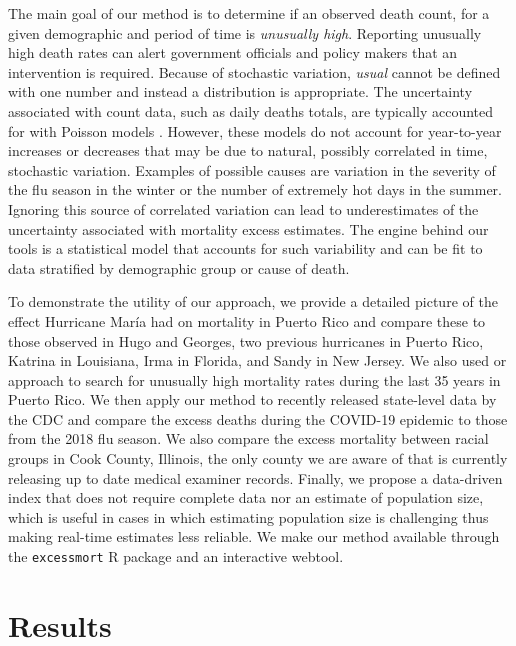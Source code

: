 \documentclass[11pt]{article}
\begin{document}
The main goal of our method is to determine if an observed death count, for a given demographic and period of time is \textit{unusually high}. Reporting unusually high death rates can alert government officials and policy makers that an intervention is required. Because of stochastic variation, \textit{usual} cannot be defined with one number and instead a distribution is appropriate. The uncertainty associated with count data, such as daily deaths totals, are typically accounted for with Poisson models \cite{mccullagh19831989, agresti2015foundations}. However, these models do not account for year-to-year increases or decreases that may be due to natural, possibly correlated in time, stochastic variation. Examples of possible causes are variation in the severity of the flu season in the winter or the number of extremely hot days in the summer. Ignoring this source of correlated variation can lead to underestimates of the uncertainty associated with mortality excess estimates. The engine behind our tools is a statistical model that accounts for such variability and can be fit to data stratified by demographic group or cause of death. 

To demonstrate the utility of our approach, we provide a detailed picture of the effect Hurricane Mar\'ia had on mortality in Puerto Rico and compare these to those observed in Hugo and Georges, two previous hurricanes in Puerto Rico, Katrina in Louisiana, Irma in Florida, and Sandy in New Jersey. We also used or approach to search for unusually high mortality rates during the last 35 years in Puerto Rico. We then apply our method to recently released state-level data by the CDC and compare the excess deaths during the COVID-19 epidemic to those from the 2018 flu season. We also compare the excess mortality between racial groups in Cook County, Illinois, the only county we are aware of that is currently releasing up to date medical examiner records. Finally, we propose a data-driven index that does not require complete data nor an estimate of population size, which is useful in cases in which estimating population size is challenging thus making real-time estimates less reliable. We make our method available through the \verb+excessmort+ R package and an interactive webtool. \\

\section{Results}
\label{sec:results}
\end{document}
